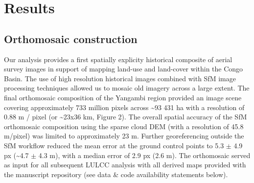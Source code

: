 \documentclass[remote sensing,article,submit,moreauthors,pdftex]{mdpi}
\begin{document}
\hypertarget{results}{%
\section{Results}\label{results}}

\hypertarget{orthomosaic-construction}{%
\subsection{Orthomosaic construction}\label{orthomosaic-construction}}

Our analysis provides a first spatially explicity historical composite
of aerial survey images in support of mapping land-use and land-cover
within the Congo Basin. The use of high resolution historical images
combined with SfM image processing techniques allowed us to mosaic old
imagery across a large extent. The final orthomosaic composition of the
Yangambi region provided an image scene covering approximately 733
million pixels across \textasciitilde{}93 431 ha with a resolution of
0.88 m / pixel (or \textasciitilde{}23x36 km, Figure 2). The overall
spatial accuracy of the SfM orthomosaic composition using the sparse
cloud DEM (with a resolution of 45.8 m/pixel) was limited to
approximately 23 m. Further georeferencing outside the SfM workflow
reduced the mean error at the ground control points to 5.3 \(\pm\) 4.9
px (\textasciitilde{}4.7 \(\pm\) 4.3 m), with a median error of 2.9 px
(2.6 m). The orthomosaic served as input for all subsequent LULCC
analysis with all derived maps provided with the manuscript repository
(see data \& code availability statements below).
\end{document}
